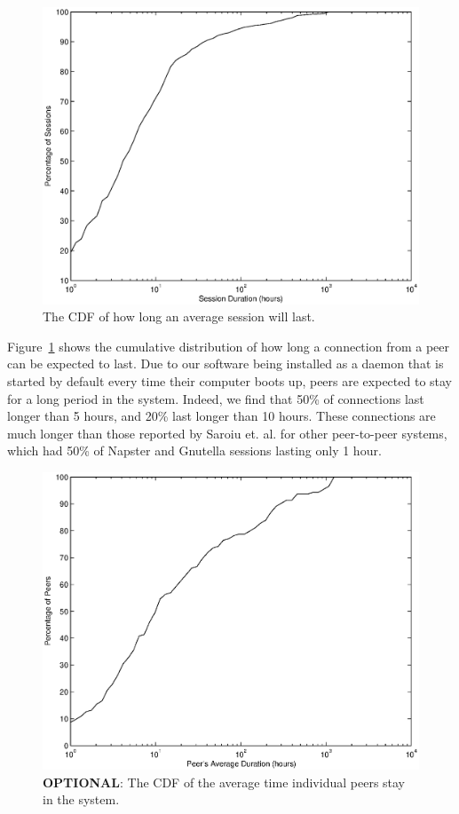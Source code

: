\documentclass[conference]{IEEEtran}
\begin{document}
\begin{figure}
\centering
\includegraphics[width=\columnwidth]{AptP2PDuration-peers.eps}
\caption{The CDF of how long an average session will last.}
\label{duration_peers}
\end{figure}

Figure~\ref{duration_peers} shows the cumulative distribution of how
long a connection from a peer can be expected to last. Due to our
software being installed as a daemon that is started by default
every time their computer boots up, peers are expected to stay for a
long period in the system.
Indeed, we find that 50\% of connections last longer than 5
hours, and 20\% last longer than 10 hours. These connections are
much longer than those reported by Saroiu et. al. \cite{saroiu2001}
for other peer-to-peer systems, which had 50\% of Napster and Gnutella
sessions lasting only 1 hour.

\begin{figure}
\centering
\includegraphics[width=\columnwidth]{AptP2PDuration-ind_peers.eps}
\caption{\textbf{OPTIONAL}: The CDF of the average time individual peers stay in the
system.}
\label{duration_ind_peers}
\end{figure}
\end{document}
